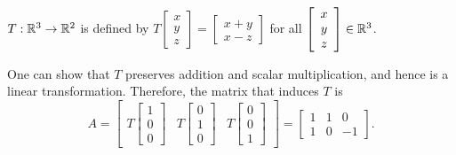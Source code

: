 \documentclass[pdf,9pt]{beamer}
\begin{document}
\begin{frame}[fragile]
\begin{example}
    $T:\mathbb{R}^3\to\mathbb{R}^2$ is defined by
    $T\left[\begin{array}{c} x \\ y \\ z \end{array}\right]
    =
    \left[\begin{array}{c} x+y \\ x-z \end{array}\right]$
    for all
    $\left[\begin{array}{c} x \\ y \\ z \end{array}\right] \in\mathbb{R}^3$.
    \medskip

    One can
    \alert{show that $T$ preserves addition and scalar multiplication},
    and hence is a linear transformation.
    Therefore, the matrix that induces $T$ is
    \[ A=\left[\begin{array}{ccc}
	    T\left[\begin{array}{c} 1 \\ 0 \\ 0 \end{array}\right] &
	    T\left[\begin{array}{c} 0 \\ 1 \\ 0 \end{array}\right] &
	    T\left[\begin{array}{c} 0 \\ 0 \\ 1 \end{array}\right]
    \end{array}\right]
    =
    \left[\begin{array}{rrr}
	    1 & 1 & 0 \\ 1 & 0 & -1
    \end{array}\right].  \]
    \end{example}
\end{frame}
\end{document}
